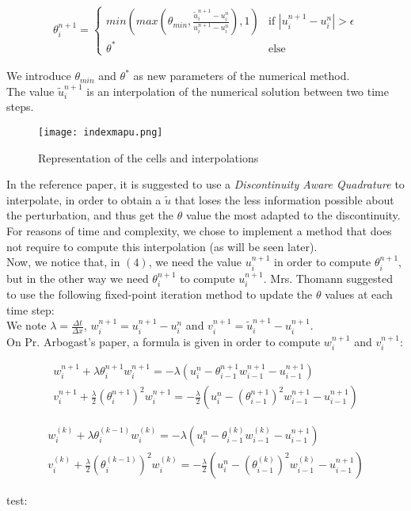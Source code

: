 \documentclass[12pt]{article}
\begin{document}
\begin{align*}
    \theta_i^{n+1} = \begin{cases}
        min(max(\theta_{min}, \frac{\tilde{u}_i^{n+1} - u_i^n}{u_i^{n+1} - u_i^n} ), 1) & \text{if } |u_i^{n+1} - u_i^n| > \epsilon \tag{4} \\
        \theta^* & \text{else} 
    \end{cases}
\end{align*}

We introduce $\theta_{min}$ and $\theta^*$ as new parameters of the numerical method.\\
The value $\tilde{u}_i^{n+1}$ is an interpolation of the numerical solution between two time steps.\\

\begin{figure}[H]
    \centering
    \texttt{[image: indexmapu.png]}
    \caption{Representation of the cells and interpolations}
\end{figure}
In the reference paper, it is suggested to use a \textit{Discontinuity Aware Quadrature} to interpolate, in order to obtain a $\tilde{u}$
that loses the less information possible about the perturbation, and thus get the $\theta$ value the most adapted to the discontinuity.
For reasons of time and complexity, we chose to implement a method that does not require to compute this interpolation (as will be seen later).\\

Now, we notice that, in $(4)$, we need the value $u_i^{n+1}$ in order to compute $\theta_i^{n+1}$,
but in the other way we need $\theta_i^{n+1}$ to compute $u_i^{n+1}$.
Mrs. Thomann suggested to use the following fixed-point iteration method to update the $\theta$ values at each time step:\\
We note $\lambda = \frac{\Delta t}{\Delta x}$, $w_i^{n+1} = u_i^{n+1} - u_i^{n}$ and $v_i^{n+1} = \tilde{u}_i^{n+1} - u_i^{n+1}$.\\
On Pr. Arbogast's paper, a formula is given in order to compute $w_i^{n+1}$ and $v_i^{n+1}$:

\begin{align*}
    w_i^{n+1} + \lambda \theta_i^{n+1} w_i^{n+1} = -\lambda(u_i^n - \theta_{i-1}^{n+1} w_{i-1}^{n+1} - u_{i-1}^{n+1}) \tag{5a}\\
    v_i^{n+1} + \frac{\lambda}{2} (\theta_i^{n+1})^2 w_i^{n+1} = -\frac{\lambda}{2} (u_i^n - (\theta_{i-1}^{n+1})^2 w_{i-1}^{n+1} - u_{i-1}^{n+1}) \tag{5b}
\end{align*}

\begin{align*}
    w_i^{(k)} + \lambda \theta_i^{(k-1)} w_i^{(k)} = -\lambda(u_i^n - \theta_{i-1}^{(k)} w_{i-1}^{(k)} - u_{i-1}^{n+1}) \tag{6a}\\
    v_i^{(k)} + \frac{\lambda}{2} (\theta_i^{(k-1)})^2 w_i^{(k)} = -\frac{\lambda}{2} (u_i^n - (\theta_{i-1}^{(k)})^2 w_{i-1}^{(k)} - u_{i-1}^{n+1}) \tag{6b}
\end{align*}


test: \textcite{arbogast2021}

\printbibliography
\end{document}
